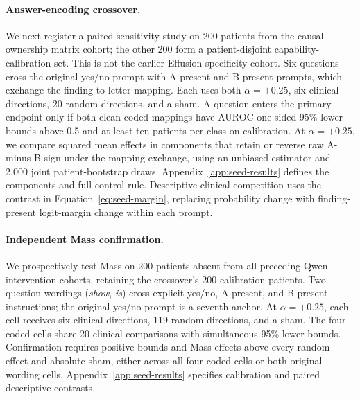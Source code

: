 \paragraph{Answer-encoding crossover.}
We next register a paired sensitivity study on 200 patients from the causal-ownership matrix cohort; the other 200 form a patient-disjoint capability-calibration set. This is not the earlier Effusion specificity cohort. Six questions cross the original yes/no prompt with A-present and B-present prompts, which exchange the finding-to-letter mapping. Each uses both $\alpha=\pm0.25$, six clinical directions, 20 random directions, and a sham. A question enters the primary endpoint only if both clean coded mappings have AUROC one-sided 95\% lower bounds above 0.5 and at least ten patients per class on calibration. At $\alpha=+0.25$, we compare squared mean effects in components that retain or reverse raw A-minus-B sign under the mapping exchange, using an unbiased estimator and 2,000 joint patient-bootstrap draws. Appendix~\ref{app:seed-results} defines the components and full control rule. Descriptive clinical competition uses the contrast in Equation~\ref{eq:seed-margin}, replacing probability change with finding-present logit-margin change within each prompt.

\paragraph{Independent Mass confirmation.}
We prospectively test Mass on 200 patients absent from all preceding Qwen intervention cohorts, retaining the crossover's 200 calibration patients. Two question wordings (\textit{show}, \textit{is}) cross explicit yes/no, A-present, and B-present instructions; the original yes/no prompt is a seventh anchor. At $\alpha=+0.25$, each cell receives six clinical directions, 119 random directions, and a sham. The four coded cells share 20 clinical comparisons with simultaneous 95\% lower bounds. Confirmation requires positive bounds and Mass effects above every random effect and absolute sham, either across all four coded cells or both original-wording cells. Appendix~\ref{app:seed-results} specifies calibration and paired descriptive contrasts.

